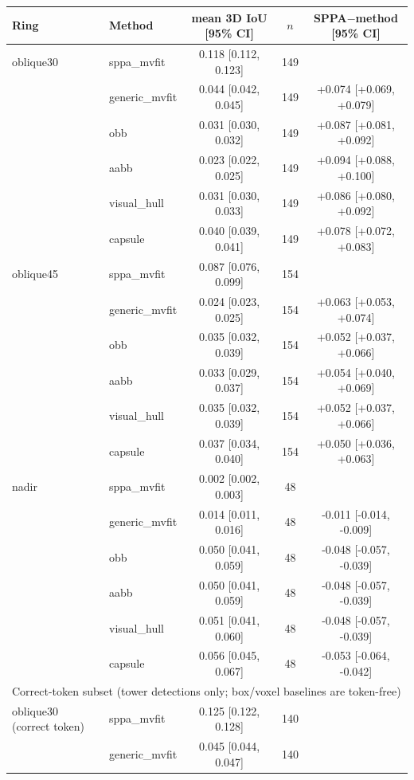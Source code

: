 \begin{tabular}{llccc}
\toprule
Ring & Method & mean 3D IoU [95\% CI] & $n$ & SPPA$-$method [95\% CI] \\
\midrule
oblique30 & sppa\_mvfit & 0.118 [0.112, 0.123] & 149 &  \\
 & generic\_mvfit & 0.044 [0.042, 0.045] & 149 & +0.074 [+0.069, +0.079] \\
 & obb & 0.031 [0.030, 0.032] & 149 & +0.087 [+0.081, +0.092] \\
 & aabb & 0.023 [0.022, 0.025] & 149 & +0.094 [+0.088, +0.100] \\
 & visual\_hull & 0.031 [0.030, 0.033] & 149 & +0.086 [+0.080, +0.092] \\
 & capsule & 0.040 [0.039, 0.041] & 149 & +0.078 [+0.072, +0.083] \\
\midrule
oblique45 & sppa\_mvfit & 0.087 [0.076, 0.099] & 154 &  \\
 & generic\_mvfit & 0.024 [0.023, 0.025] & 154 & +0.063 [+0.053, +0.074] \\
 & obb & 0.035 [0.032, 0.039] & 154 & +0.052 [+0.037, +0.066] \\
 & aabb & 0.033 [0.029, 0.037] & 154 & +0.054 [+0.040, +0.069] \\
 & visual\_hull & 0.035 [0.032, 0.039] & 154 & +0.052 [+0.037, +0.066] \\
 & capsule & 0.037 [0.034, 0.040] & 154 & +0.050 [+0.036, +0.063] \\
\midrule
nadir & sppa\_mvfit & 0.002 [0.002, 0.003] & 48 &  \\
 & generic\_mvfit & 0.014 [0.011, 0.016] & 48 & -0.011 [-0.014, -0.009] \\
 & obb & 0.050 [0.041, 0.059] & 48 & -0.048 [-0.057, -0.039] \\
 & aabb & 0.050 [0.041, 0.059] & 48 & -0.048 [-0.057, -0.039] \\
 & visual\_hull & 0.051 [0.041, 0.060] & 48 & -0.048 [-0.057, -0.039] \\
 & capsule & 0.056 [0.045, 0.067] & 48 & -0.053 [-0.064, -0.042] \\
\midrule
\multicolumn{5}{l}{Correct-token subset (tower detections only; box/voxel baselines are token-free)} \\
\midrule
oblique30 (correct token) & sppa_mvfit & 0.125 [0.122, 0.128] & 140 &  \\
 & generic_mvfit & 0.045 [0.044, 0.047] & 140 &  \\

\end{tabular}
